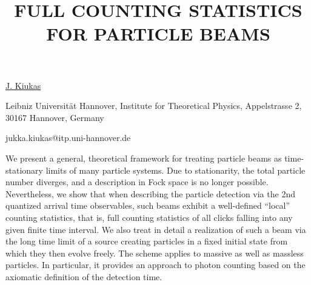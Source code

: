 \title{FULL COUNTING STATISTICS FOR PARTICLE BEAMS}

\underline{J. Kiukas} 

{\normalsize{\vspace{-4mm}
Leibniz Universit\"{a}t Hannover, Institute for Theoretical Physics,
Appelstrasse 2, 30167 Hannover, Germany

\email jukka.kiukas@itp.uni-hannover.de}}

We present a general, theoretical framework for treating particle beams as time-stationary limits of many particle systems. Due to
stationarity, the total particle number diverges, and a description in Fock space is no longer possible. Nevertheless, we show that
when describing the particle detection via the 2nd quantized arrival time observables, such beams exhibit a well-defined ``local''
counting statistics, that is, full counting statistics of all clicks falling into any given finite time interval. We also treat in detail a
realization of such a beam via the long time limit of a source creating particles in a fixed initial state from which they then evolve
freely. The scheme applies to massive as well as massless particles. In particular, it provides an approach to photon counting based
on the axiomatic definition of the detection time.

\vspace{\baselineskip} 